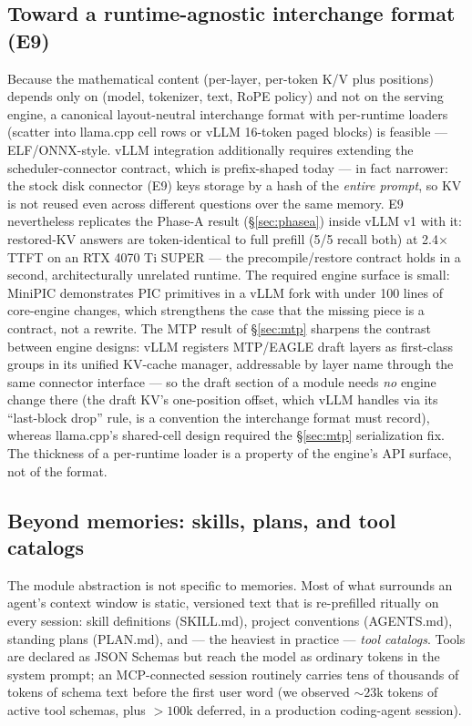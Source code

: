 \documentclass[11pt]{article}
\begin{document}
\subsection{Toward a runtime-agnostic interchange format (E9)}
\label{sec:interchange}

Because the mathematical content (per-layer, per-token K/V plus positions) depends only on (model, tokenizer, text, RoPE policy) and not on the serving engine, a canonical layout-neutral interchange format with per-runtime loaders (scatter into llama.cpp cell rows or vLLM 16-token paged blocks) is feasible --- ELF/ONNX-style. vLLM integration additionally requires extending the scheduler-connector contract, which is prefix-shaped today --- in fact narrower: the stock disk connector (E9) keys storage by a hash of the \emph{entire prompt}, so KV is not reused even across different questions over the same memory. E9 nevertheless replicates the Phase-A result (\S\ref{sec:phasea}) inside vLLM v1 with it: restored-KV answers are token-identical to full prefill (5/5 recall both) at 2.4$\times$ TTFT on an RTX 4070 Ti SUPER --- the precompile/restore contract holds in a second, architecturally unrelated runtime. The required engine surface is small: MiniPIC \citep{ordonez2026} demonstrates PIC primitives in a vLLM fork with under 100 lines of core-engine changes, which strengthens the case that the missing piece is a contract, not a rewrite. The MTP result of \S\ref{sec:mtp} sharpens the contrast between engine designs: vLLM registers MTP/EAGLE draft layers as first-class groups in its unified KV-cache manager, addressable by layer name through the same connector interface --- so the draft section of a module needs \emph{no} engine change there (the draft KV's one-position offset, which vLLM handles via its ``last-block drop'' rule, is a convention the interchange format must record), whereas llama.cpp's shared-cell design required the \S\ref{sec:mtp} serialization fix. The thickness of a per-runtime loader is a property of the engine's API surface, not of the format.

\subsection{Beyond memories: skills, plans, and tool catalogs}
\label{sec:skills}

The module abstraction is not specific to memories. Most of what surrounds an agent's context window is static, versioned text that is re-prefilled ritually on every session: skill definitions (SKILL.md), project conventions (AGENTS.md), standing plans (PLAN.md), and --- the heaviest in practice --- \emph{tool catalogs}. Tools are declared as JSON Schemas but reach the model as ordinary tokens in the system prompt; an MCP-connected session routinely carries tens of thousands of tokens of schema text before the first user word (we observed ${\sim}23$k tokens of active tool schemas, plus ${>}100$k deferred, in a production coding-agent session).
\end{document}
